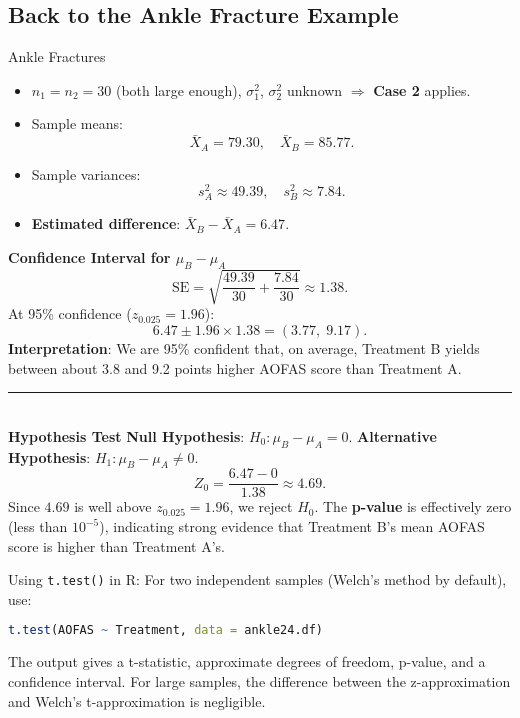 \documentclass[10pt]{extarticle}
\begin{document}
\subsection{Back to the Ankle Fracture Example}
\begin{examplebox}{Ankle Fractures}{}
    \begin{itemize}
        \item $n_1 = n_2 = 30$ (both large enough), $\sigma_1^2$, $\sigma_2^2$ unknown $\Rightarrow$ \textbf{Case 2} applies.
        \item Sample means:
              $$
                  \bar{X}_A = 79.30,\quad \bar{X}_B = 85.77.
              $$
        \item Sample variances:
              $$
                  s_A^2 \approx 49.39,\quad s_B^2 \approx 7.84.
              $$
        \item \textbf{Estimated difference}: $\bar{X}_B - \bar{X}_A = 6.47$.
    \end{itemize}
    \textbf{Confidence Interval for $\mu_B - \mu_A$}
    $$
        \text{SE} = \sqrt{\frac{49.39}{30} + \frac{7.84}{30}} \approx 1.38.
    $$
    At 95\% confidence ($z_{0.025}=1.96$):
    $$
        6.47 \pm 1.96 \times 1.38 = (3.77,\; 9.17).
    $$
    \textbf{Interpretation}: We are 95\% confident that, on average, Treatment B yields between about 3.8 and 9.2 points higher AOFAS score than Treatment A.

    \noindent\rule{\textwidth}{1pt} \\ [2ex]
    \textbf{Hypothesis Test}
    \textbf{Null Hypothesis}: $H_0 : \mu_B - \mu_A = 0$.
    \textbf{Alternative Hypothesis}: $H_1 : \mu_B - \mu_A \neq 0$.
    $$
        Z_0 = \frac{6.47 - 0}{1.38} \approx 4.69.
    $$
    Since $4.69$ is well above $z_{0.025}=1.96$, we reject $H_0$. The \textbf{p-value} is effectively zero (less than $10^{-5}$), indicating strong evidence that Treatment B's mean AOFAS score is higher than Treatment A's.
\end{examplebox}
\begin{conceptbox}{Using \texttt{t.test()} in R:}{}
    For two independent samples (Welch's method by default), use:
    \begin{lstlisting}[language=r]
    t.test(AOFAS ~ Treatment, data = ankle24.df)
    \end{lstlisting}
    The output gives a t-statistic, approximate degrees of freedom, p-value, and a confidence interval. For large samples, the difference between the z-approximation and Welch's t-approximation is negligible.
\end{conceptbox}
\end{document}
